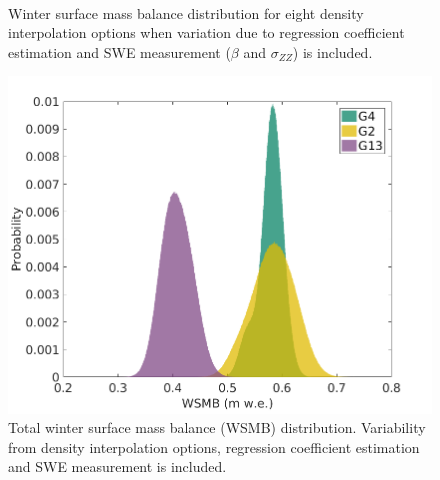 \documentclass[12pt]{article}
\begin{document}
\begin{figure}[H]
	\centering
	\\
	\caption{Winter surface mass balance distribution for eight density interpolation options when variation due to regression coefficient estimation and SWE measurement ($\beta$ and $\sigma_{ZZ}$) is included. }
	\label{fig:WSMB_DistributionbetaNzz}
\end{figure}

\begin{figure}[H]
	\centering
	\includegraphics[width =\textwidth]{WSMB_dNbetaNzz.png}
	\caption{Total winter surface mass balance (WSMB) distribution. Variability from density interpolation options, regression coefficient estimation and SWE measurement is included. }
	\label{fig:WSMB_dNbetaNzz}
\end{figure}



\end{document}
